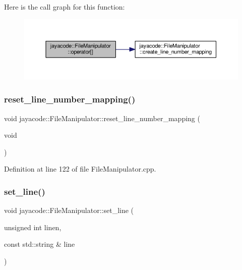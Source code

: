 Here is the call graph for this function\+:
\nopagebreak
\begin{figure}[H]
\begin{center}
\leavevmode
\includegraphics[width=350pt]{classjayacode_1_1_file_manipulator_a826ec04085638ec37ea29a43b895152c_cgraph}
\end{center}
\end{figure}
\mbox{\label{classjayacode_1_1_file_manipulator_afd35deee67597d495224f31628f73050}} 
\subsubsection{\texorpdfstring{reset\+\_\+line\+\_\+number\+\_\+mapping()}{reset\_line\_number\_mapping()}}
{\footnotesize\ttfamily void jayacode\+::\+File\+Manipulator\+::reset\+\_\+line\+\_\+number\+\_\+mapping (\begin{DoxyParamCaption}\item[{void}]{ }\end{DoxyParamCaption})}



Definition at line 122 of file File\+Manipulator.\+cpp.

\mbox{\label{classjayacode_1_1_file_manipulator_a6206218fbe436c7899f268f34ba73431}} 
\subsubsection{\texorpdfstring{set\+\_\+line()}{set\_line()}}
{\footnotesize\ttfamily void jayacode\+::\+File\+Manipulator\+::set\+\_\+line (\begin{DoxyParamCaption}\item[{unsigned int}]{linen,  }\item[{const std\+::string \&}]{line }\end{DoxyParamCaption})}



